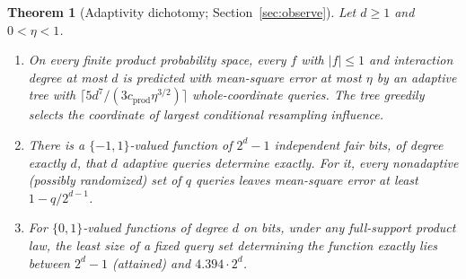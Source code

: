 \documentclass[11pt]{article}
\numberwithin{equation}{section}
\newtheorem{theorem}{Theorem}[section]
\theoremstyle{definition}
\theoremstyle{remark}
\newcommand{\1}{\mathbf 1}
\newcommand{\cprod}{c_{\mathrm{prod}}}
\begin{document}
\begin{theorem}[Adaptivity dichotomy; Section~\ref{sec:observe}]\label{thm:dichotomy}
Let $d\ge1$ and $0<\eta<1$.
\begin{enumerate}[label=(\alph*),itemsep=1pt]
\item On every finite product probability space, every $f$ with $|f|\le1$ and interaction degree at most $d$ is predicted with mean-square error at most $\eta$ by an adaptive tree with $\lceil5d^7/(3\cprod\eta^{3/2})\rceil$ whole-coordinate queries. The tree greedily selects the coordinate of largest conditional resampling influence.
\item There is a $\{-1,1\}$-valued function of $2^d-1$ independent fair bits, of degree exactly $d$, that $d$ adaptive queries determine exactly. For it, every nonadaptive (possibly randomized) set of $q$ queries leaves mean-square error at least $1-q/2^{d-1}$.
\item For $\{0,1\}$-valued functions of degree $d$ on bits, under any full-support product law, the least size of a fixed query set determining the function exactly lies between $2^d-1$ (attained) and $4.394\cdot2^d$.
\end{enumerate}
\end{theorem}
\end{document}
